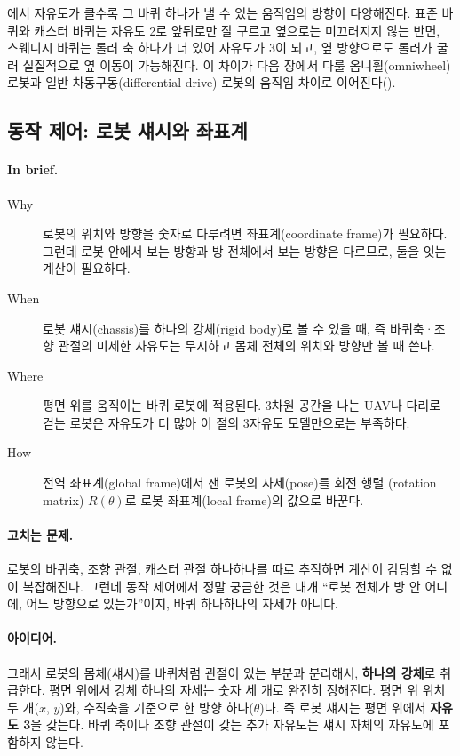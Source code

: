에서 자유도가 클수록 그 바퀴 하나가 낼 수 있는 움직임의
방향이 다양해진다. 표준 바퀴와 캐스터 바퀴는 자유도 2로 앞뒤로만 잘 구르고
옆으로는 미끄러지지 않는 반면, 스웨디시 바퀴는 롤러 축 하나가 더 있어 자유도가
3이 되고, 옆 방향으로도 롤러가 굴러 실질적으로 옆 이동이 가능해진다. 이 차이가
다음 장에서 다룰 옴니휠(omniwheel) 로봇과 일반 차동구동(differential drive)
로봇의 움직임 차이로 이어진다().

\subsection{동작 제어: 로봇 섀시와 좌표계}
\label{sec:lec01-chassis}

\paragraph{In brief.}
\begin{description}
  \item[Why] 로봇의 위치와 방향을 숫자로 다루려면 좌표계(coordinate frame)가
    필요하다. 그런데 로봇 안에서 보는 방향과 방 전체에서 보는 방향은 다르므로,
    둘을 잇는 계산이 필요하다.
  \item[When] 로봇 섀시(chassis)를 하나의 강체(rigid body)로 볼 수 있을 때,
    즉 바퀴축·조향 관절의 미세한 자유도는 무시하고 몸체 전체의 위치와 방향만
    볼 때 쓴다.
  \item[Where] 평면 위를 움직이는 바퀴 로봇에 적용된다. 3차원 공간을 나는
    UAV나 다리로 걷는 로봇은 자유도가 더 많아 이 절의 3자유도 모델만으로는
    부족하다.
  \item[How] 전역 좌표계(global frame)에서 잰 로봇의 자세(pose)를 회전 행렬
    (rotation matrix) $R(\theta)$로 로봇 좌표계(local frame)의 값으로
    바꾼다.
\end{description}

\paragraph{고치는 문제.} 로봇의 바퀴축, 조향 관절, 캐스터 관절 하나하나를
따로 추적하면 계산이 감당할 수 없이 복잡해진다. 그런데 동작 제어에서 정말
궁금한 것은 대개 ``로봇 전체가 방 안 어디에, 어느 방향으로 있는가''이지,
바퀴 하나하나의 자세가 아니다.

\paragraph{아이디어.} 그래서 로봇의 몸체(섀시)를 바퀴처럼 관절이 있는
부분과 분리해서, \textbf{하나의 강체}로 취급한다. 평면 위에서 강체 하나의
자세는 숫자 세 개로 완전히 정해진다. 평면 위 위치 두 개($x$, $y$)와,
수직축을 기준으로 한 방향 하나($\theta$)다. 즉 로봇 섀시는 평면 위에서
\textbf{자유도 3}을 갖는다. 바퀴 축이나 조향 관절이 갖는 추가 자유도는
섀시 자체의 자유도에 포함하지 않는다. %

